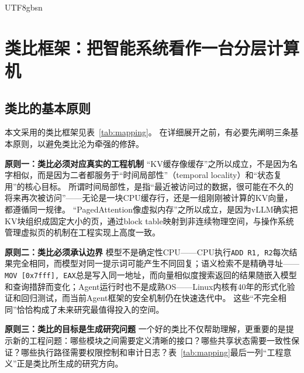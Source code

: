 \documentclass[11pt,a4paper]{article}
\begin{document}
\begin{CJK*}{UTF8}{gbsn}
\section{类比框架：把智能系统看作一台分层计算机}
\label{sec:framework}

\subsection{类比的基本原则}

本文采用的类比框架见表~\ref{tab:mapping}。
在详细展开之前，有必要先阐明三条基本原则，以避免类比沦为牵强的修辞。

\textbf{原则一：类比必须对应真实的工程机制}
``KV缓存像缓存''之所以成立，不是因为名字相似，而是因为二者都服务于``时间局部性''（temporal locality）和``状态复用''的核心目标\cite{drepper2007memory,kwon2023pagedattention}。
所谓时间局部性，是指``最近被访问过的数据，很可能在不久的将来再次被访问''——无论是一块CPU缓存行，还是一组刚刚被计算的KV向量，都遵循同一规律。
``PagedAttention像虚拟内存''之所以成立，是因为vLLM确实把KV块组织成固定大小的页，通过block table映射到非连续物理空间，与操作系统管理虚拟页的机制在工程实现上高度一致\cite{kwon2023pagedattention}。

\textbf{原则二：类比必须承认边界}
模型不是确定性CPU——CPU执行\texttt{ADD R1, R2}每次结果完全相同，而模型对同一提示词可能产生不同回复；语义检索不是精确寻址——\texttt{MOV [0x7fff], EAX}总是写入同一地址，而向量相似度搜索返回的结果随嵌入模型和查询措辞而变化；Agent运行时也不是成熟OS——Linux内核有40年的形式化验证和回归测试，而当前Agent框架的安全机制仍在快速迭代中。
这些``不完全相同''恰恰构成了未来研究最值得投入的空间。

\textbf{原则三：类比的目标是生成研究问题}
一个好的类比不仅帮助理解，更重要的是提示新的工程问题：哪些模块之间需要定义清晰的接口？哪些共享状态需要一致性保证？哪些执行路径需要权限控制和审计日志？表~\ref{tab:mapping}最后一列``工程意义''正是类比所生成的研究方向。


\end{CJK*}
\end{document}
